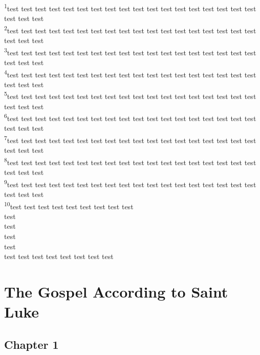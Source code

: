 \documentclass[10pt,twocolumn]{memoir}
\newcommand{\verseref}[2]{\textsuperscript{#2}}
\begin{document}
\noindent
\verseref{3}{1}test test test test test test test test test test test test test test test test test test test test test\\ 
\verseref{3}{2}test test test test test test test test test test test test test test test test test test test test test\\ 
\verseref{3}{3}test test test test test test test test test test test test test test test test test test test test test\\ 
\verseref{3}{4}test test test test test test test test test test test test test test test test test test test test test\\ 
\verseref{3}{5}test test test test test test test test test test test test test test test test test test test test test\\ 
\verseref{3}{6}test test test test test test test test test test test test test test test test test test test test test\\ 
\verseref{3}{7}test test test test test test test test test test test test test test test test test test test test test\\ 
\verseref{3}{8}test test test test test test test test test test test test test test test test test test test test test\\ 
\verseref{3}{9}test test test test test test test test test test test test test test test test test test test test test\\ 
\verseref{3}{10}test test test test test test test test test\\ test\\ test\\ test\\ test\\ test test test test test test test test\\

\chapter*{The Gospel According to Saint Luke}

\section*{Chapter 1}
\end{document}
